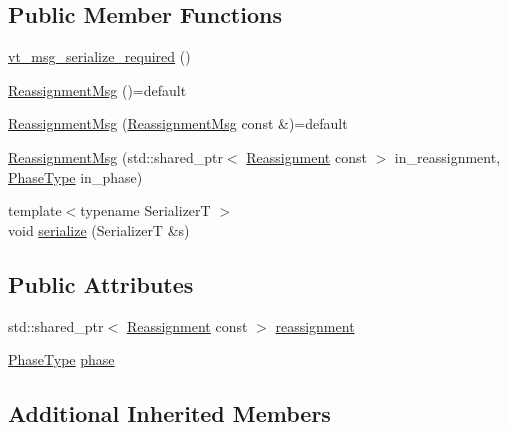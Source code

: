 \subsection*{Public Member Functions}
\begin{DoxyCompactItemize}
\item 
\hyperlink{structvt_1_1vrt_1_1collection_1_1balance_1_1_reassignment_msg_a68f835c023a0e40d572e160658f21a79}{vt\+\_\+msg\+\_\+serialize\+\_\+required} ()
\item 
\hyperlink{structvt_1_1vrt_1_1collection_1_1balance_1_1_reassignment_msg_aa5793ed4bbfed8a90e555088448340f3}{Reassignment\+Msg} ()=default
\item 
\hyperlink{structvt_1_1vrt_1_1collection_1_1balance_1_1_reassignment_msg_a763b37977eaa7d5622a4a2d08c97fbb5}{Reassignment\+Msg} (\hyperlink{structvt_1_1vrt_1_1collection_1_1balance_1_1_reassignment_msg}{Reassignment\+Msg} const \&)=default
\item 
\hyperlink{structvt_1_1vrt_1_1collection_1_1balance_1_1_reassignment_msg_acd76d7b6d8b825e1ab58dcd44d35cc9d}{Reassignment\+Msg} (std\+::shared\+\_\+ptr$<$ \hyperlink{structvt_1_1vrt_1_1collection_1_1balance_1_1_reassignment}{Reassignment} const $>$ in\+\_\+reassignment, \hyperlink{namespacevt_a46ce6733d5cdbd735d561b7b4029f6d7}{Phase\+Type} in\+\_\+phase)
\item 
{\footnotesize template$<$typename SerializerT $>$ }\\void \hyperlink{structvt_1_1vrt_1_1collection_1_1balance_1_1_reassignment_msg_a858ca0307078495273574e1443992173}{serialize} (SerializerT \&s)
\end{DoxyCompactItemize}
\subsection*{Public Attributes}
\begin{DoxyCompactItemize}
\item 
std\+::shared\+\_\+ptr$<$ \hyperlink{structvt_1_1vrt_1_1collection_1_1balance_1_1_reassignment}{Reassignment} const  $>$ \hyperlink{structvt_1_1vrt_1_1collection_1_1balance_1_1_reassignment_msg_a17f0d17ffa2e5ba75e5b114a6de20449}{reassignment}
\item 
\hyperlink{namespacevt_a46ce6733d5cdbd735d561b7b4029f6d7}{Phase\+Type} \hyperlink{structvt_1_1vrt_1_1collection_1_1balance_1_1_reassignment_msg_aa50fedcf313128383376cc636dacb0a7}{phase}
\end{DoxyCompactItemize}
\subsection*{Additional Inherited Members}


